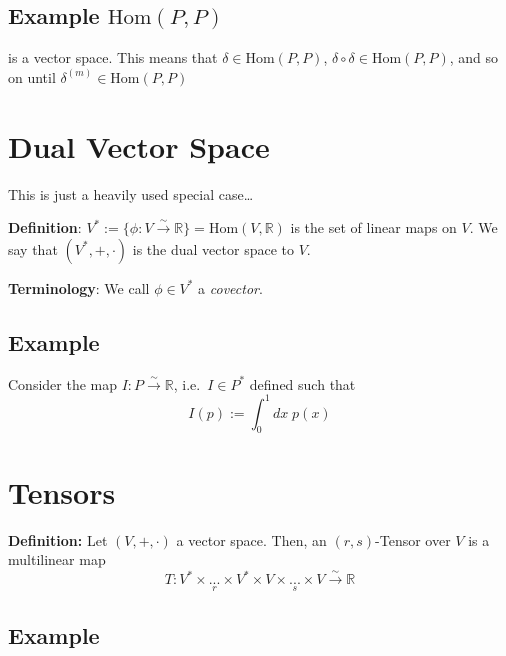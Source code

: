 \documentclass[
  letterpaper,
  DIV=11,
  numbers=noendperiod,
  oneside]{scrreprt}
\begin{document}
\hypertarget{example-texthompp}{%
\subsection{\texorpdfstring{Example
\(\text{Hom}(P,P)\)}{Example \textbackslash text\{Hom\}(P,P)}}\label{example-texthompp}}

is a vector space. This means that \(\delta \in \text{Hom}(P,P)\),
\(\delta \circ \delta \in \text{Hom}(P, P)\), and so on until
\(\delta^{(m)} \in \text{Hom}(P,P)\)

\hypertarget{dual-vector-space}{%
\section{Dual Vector Space}\label{dual-vector-space}}

This is just a heavily used special case\ldots{}

\textbf{Definition}:
\(V^* := \{\phi:V\xrightarrow{\sim} \mathbb{R}\} = \text{Hom}(V, \mathbb{R})\)
is the set of linear maps on \(V\). We say that \((V^*, +, \cdot)\) is
the dual vector space to \(V\).

\textbf{Terminology}: We call \(\phi \in V^*\) a \emph{covector}.

\hypertarget{example-2}{%
\subsection{Example}\label{example-2}}

Consider the map \(I:P\xrightarrow{\sim}\mathbb{R}\), i.e.~\(I\in P^*\)
defined such that \begin{equation}
    I(p) := \int_0^1 dx \; p(x)
\end{equation}

\hypertarget{tensors}{%
\section{Tensors}\label{tensors}}

\textbf{Definition:} Let \((V, +, \cdot)\) a vector space. Then, an
\((r,s)\)-Tensor over \(V\) is a multilinear map \begin{equation}
    T: V^*\times \underset{r}{...} \times V^* \times V\times \underset{s}{...} \times V \xrightarrow{\sim} \mathbb{R}
\end{equation}

\hypertarget{example-3}{%
\subsection{Example}\label{example-3}}
\end{document}
